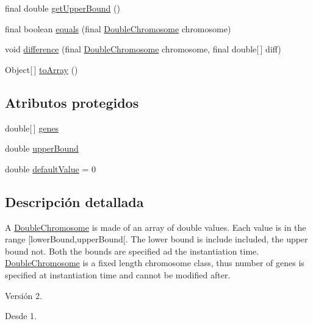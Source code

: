 \begin{DoxyCompactItemize}
\item 
final double \hyperlink{classjenes_1_1chromosome_1_1_double_chromosome_a7f4fe0c4dd1645f02ebbb2633d6610c8}{get\-Upper\-Bound} ()
\item 
final boolean \hyperlink{classjenes_1_1chromosome_1_1_double_chromosome_ad661abf584ceb5195b6b248798709fc9}{equals} (final \hyperlink{classjenes_1_1chromosome_1_1_double_chromosome}{Double\-Chromosome} chromosome)
\item 
void \hyperlink{classjenes_1_1chromosome_1_1_double_chromosome_a10f461747c9f99c02405626cf82aee46}{difference} (final \hyperlink{classjenes_1_1chromosome_1_1_double_chromosome}{Double\-Chromosome} chromosome, final double\mbox{[}$\,$\mbox{]} diff)
\item 
Object\mbox{[}$\,$\mbox{]} \hyperlink{classjenes_1_1chromosome_1_1_double_chromosome_a101d1eb5ebc632c0c5d0a1c5b65daa90}{to\-Array} ()
\end{DoxyCompactItemize}
\subsection*{Atributos protegidos}
\begin{DoxyCompactItemize}
\item 
double\mbox{[}$\,$\mbox{]} \hyperlink{classjenes_1_1chromosome_1_1_double_chromosome_a0a987b7f1fa1c4cec652330ad77b6ba6}{genes}
\item 
double \hyperlink{classjenes_1_1chromosome_1_1_double_chromosome_a56362107033b220e75d83b75ea91b74e}{upper\-Bound}
\item 
double \hyperlink{classjenes_1_1chromosome_1_1_double_chromosome_a5c2d56f7d05b08c75013a7529ae46839}{default\-Value} = 0
\end{DoxyCompactItemize}


\subsection{Descripción detallada}
A \hyperlink{classjenes_1_1chromosome_1_1_double_chromosome}{Double\-Chromosome} is made of an array of double values. Each value is in the range \mbox{[}lower\-Bound,upper\-Bound\mbox{[}. The lower bound is include included, the upper bound not. Both the bounds are specified ad the instantiation time. \hyperlink{classjenes_1_1chromosome_1_1_double_chromosome}{Double\-Chromosome} is a fixed length chromosome class, thus number of genes is specified at instantiation time and cannot be modified after.

\begin{DoxyVersion}{Versión}
2. 
\end{DoxyVersion}
\begin{DoxySince}{Desde}
1. 
\end{DoxySince}


